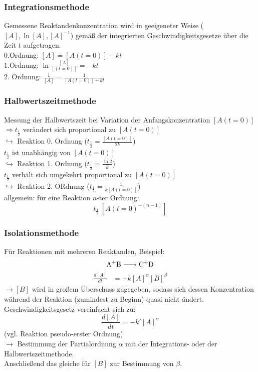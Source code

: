 \documentclass[a4paper, fleqn]{article}
\begin{document}
\subsubsection{Integrationsmethode}
Gemessene Reaktandenkonzentration wird in geeigeneter Weise ($[A], \ln [A], [A]^{-1}$) gemäß der integrierten Geschwindigkeitsgesetze über die Zeit $t$ aufgetragen.\\
0.Ordnung: $[A] = [A(t=0)]-kt$\\
1.Ordnung: $\ln \frac{[A]}{[(t=0)]} = -kt$\\
2. Ordnung: $\frac{1}{[A]} = \frac{1}{[A(t=0)]+kt}$\\

\subsubsection{Halbwertszeitmethode}
Messung der Halbwertszeit bei Variation der Anfangskonzentration $[A(t=0)]$\\
$\Rightarrow t_\frac{1}{2}$ verändert sich proportional zu $[A(t=0)]$\\
$\hookrightarrow$ Reaktion 0. Ordnung ($t_\frac{1}{2} = \frac{[A(t=0)]}{2k}$)\\
$t_\frac{1}{2}$ ist unabhängig von $[A(t=0)]$\\
$\hookrightarrow$ Reaktion 1. Ordnung ($t_\frac{1}{2}=\frac{\ln 2}{k}$)\\
$t_\frac{1}{2}$ verhält sich umgekehrt proportional zu $[A(t=0)]$\\
$\hookrightarrow$ Reaktion 2. ORdnung ($t_\frac{1}{2} = \frac{1}{k[A(t=0)]}$)\\
allgemein: für eine Reaktion $n$-ter Ordnung:\\
\begin{equation*}
    t_\frac{1}{2} ~ [A(t=0)^{-(n-1)}]
\end{equation*}

\subsubsection{Isolationsmethode}
Für Reaktionen mit mehreren Reaktanden, Beispiel:\\
\begin{equation*}
    \ce{A+B -> C+D}
\end{equation*}
\begin{align*}
    \frac{d[A]}{dt} &= -k[A]^\alpha[B]^\beta
\end{align*}
$\rightarrow [B]$ wird in großem Überschuss zugegeben, sodass sich dessen Konzentration während der Reaktion (zumindest zu Beginn) quasi nicht ändert.\\
Geschwindigkeitsgesetz vereinfacht sich zu:\\
\begin{equation*}
    \frac{d[A]}{dt} = -k'[A]^\alpha
\end{equation*}
(vgl. Reaktion pseudo-erster Ordnung)\\
$\rightarrow$ Bestimmung der Partialordnung $\alpha$ mit der Integrations- oder der Halbwertszeitmethode.\\
Anschließend das gleiche für $[B]$ zur Bestimmung von $\beta$.
\end{document}
